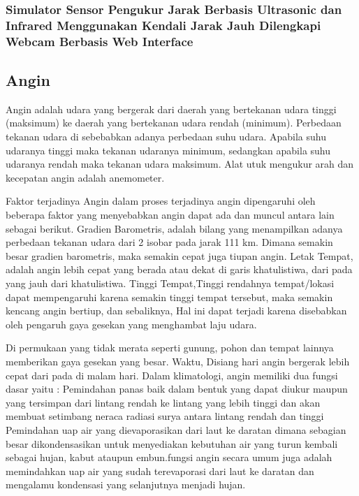 \subsubsection{Simulator Sensor Pengukur Jarak Berbasis Ultrasonic dan Infrared Menggunakan Kendali Jarak Jauh Dilengkapi Webcam Berbasis Web Interface}



\subsection{Angin}

Angin adalah udara yang bergerak dari daerah yang bertekanan udara tinggi (maksimum) ke daerah yang bertekanan udara rendah (minimum). Perbedaan tekanan udara di sebebabkan adanya perbedaan suhu udara. Apabila suhu udaranya tinggi maka tekanan udaranya minimum, sedangkan apabila suhu udaranya rendah maka tekanan udara maksimum. Alat utuk mengukur arah dan kecepatan angin adalah anemometer.

Faktor terjadinya Angin dalam proses terjadinya angin dipengaruhi oleh beberapa faktor yang menyebabkan angin dapat ada dan muncul antara lain sebagai berikut. Gradien Barometris, adalah bilang yang menampilkan adanya perbedaan tekanan udara dari 2 isobar pada jarak 111 km. Dimana semakin besar gradien barometris, maka semakin cepat juga tiupan angin. Letak Tempat, adalah angin lebih cepat yang berada atau dekat di garis khatulistiwa, dari pada yang jauh dari khatulistiwa. Tinggi Tempat,Tinggi rendahnya tempat/lokasi dapat mempengaruhi karena semakin tinggi tempat tersebut, maka semakin kencang angin bertiup, dan sebaliknya, Hal ini dapat terjadi karena disebabkan oleh pengaruh gaya gesekan yang menghambat laju udara.

Di permukaan yang tidak merata seperti gunung, pohon dan tempat lainnya memberikan gaya gesekan yang besar. Waktu, Disiang hari angin bergerak lebih cepat dari pada di malam hari. Dalam klimatologi, angin memiliki dua fungsi dasar yaitu : Pemindahan panas baik dalam bentuk yang dapat diukur maupun yang tersimpan dari lintang rendah ke lintang yang lebih tinggi dan akan membuat setimbang neraca radiasi surya antara lintang rendah dan tinggi Pemindahan uap air yang dievaporasikan dari laut ke daratan dimana sebagian besar dikondensasikan untuk menyediakan kebutuhan air yang turun kembali sebagai hujan, kabut ataupun embun.fungsi angin secara umum juga adalah memindahkan uap air yang sudah terevaporasi dari laut ke daratan dan mengalamu kondensasi yang selanjutnya menjadi hujan.

